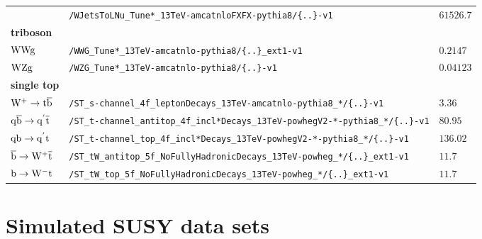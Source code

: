 \begin{table}[tb]
\begin{tabular}[width=\textwidth]{lll}
                                                   & \verb|/WJetsToLNu_Tune*_13TeV-amcatnloFXFX-pythia8/{..}-v1| & $61526.7$                                 \\
  \textbf{triboson}                                &                         &                                           \\
  $\mathrm{W}\mathrm{W}\mathrm{g}$                                      & \verb|/WWG_Tune*_13TeV-amcatnlo-pythia8/{..}_ext1-v1| & $0.2147$                                  \\
  $\mathrm{W}\mathrm{Z}\mathrm{g}$                                      & \verb|/WZG_Tune*_13TeV-amcatnlo-pythia8/{..}-v1| & $0.04123$                                 \\
  \textbf{single top}                              &                         &                                           \\
  $\mathrm{W^+}\to\mathrm{t}\overline{\mathrm{b}}$                             & \verb|/ST_s-channel_4f_leptonDecays_13TeV-amcatnlo-pythia8_*/{..}-v1| & $3.36$                                    \\
  $\mathrm{q}\overline{\mathrm{b}}\to\mathrm{q}^{'}\overline{\mathrm{t}}$                    & \verb|/ST_t-channel_antitop_4f_incl*Decays_13TeV-powhegV2-*-pythia8_*/{..}-v1| & $80.95$                                   \\
  $\mathrm{q}\mathrm{b}\to\mathrm{q}^{'}\mathrm{t}$                      & \verb|/ST_t-channel_top_4f_incl*Decays_13TeV-powhegV2-*-pythia8_*/{..}-v1| & $136.02$                                  \\
  $\overline{\mathrm{b}}\to\mathrm{W^+}\overline{\mathrm{t}}$                            & \verb|/ST_tW_antitop_5f_NoFullyHadronicDecays_13TeV-powheg_*/{..}_ext1-v1| & $11.7$                                    \\
  $\mathrm{b}\to\mathrm{W^-}\mathrm{t}$                              & \verb|/ST_tW_top_5f_NoFullyHadronicDecays_13TeV-powheg_*/{..}_ext1-v1| & $11.7$                                    \\
  \hline
 \end{tabular}
\end{table}

\FloatBarrier
\section*{Simulated SUSY data sets}


